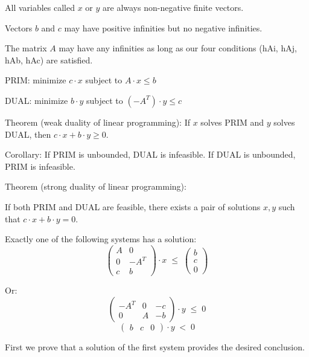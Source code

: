 \documentclass[]{article}
\begin{document}
	

All variables called $x$ or $y$ are always non-negative finite vectors.

Vectors $b$ and $c$ may have positive infinities but no negative infinities.

The matrix $A$ may have any infinities as long as our four conditions (hAi, hAj, hAb, hAc) are satisfied.

PRIM:
minimize $c \cdot x$ subject to $A \cdot x \le b$

DUAL:
minimize $b \cdot y$ subject to $(-A^T) \cdot y \le c$

Theorem (weak duality of linear programming):
If $x$ solves PRIM and $y$ solves DUAL, then
$c \cdot x + b \cdot y \ge 0$.

Corollary:
If PRIM is unbounded, DUAL is infeasible.
If DUAL is unbounded, PRIM is infeasible.
\bigskip

Theorem (strong duality of linear programming):

If both PRIM and DUAL are feasible, there exists a pair of solutions $x, y$ such that
$c \cdot x + b \cdot y = 0$.

Exactly one of the following systems has a solution:
$$
\begin{pmatrix}
	A & 0 \\
	0 & -A^T \\
	c & b
\end{pmatrix}
\cdot x
\;\le\;
\begin{pmatrix}
	b \\
	c \\
	0
\end{pmatrix}
$$

Or:
$$
\begin{pmatrix}
	-A^T & 0 & -c \\
	0 & A & -b
\end{pmatrix}
\cdot y
\;\le\;
0
$$
$$
\begin{pmatrix}
	b & c & 0
\end{pmatrix}
\cdot y
\;<\;
0
$$

First we prove that a solution of the first system provides the desired conclusion.
\end{document}
